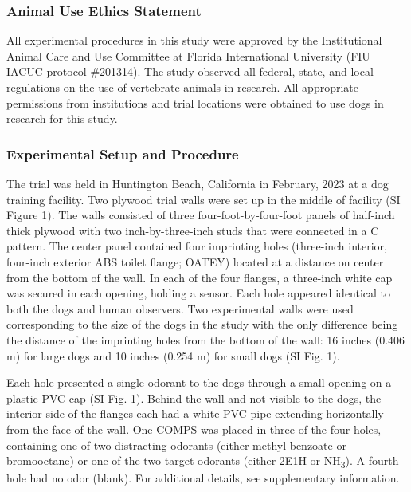 \documentclass[
]{article}
\begin{document}
\hypertarget{animal-use-ethics-statement}{%
\subsubsection{Animal Use Ethics Statement}\label{animal-use-ethics-statement}}

All experimental procedures in this study were approved by the Institutional Animal Care and Use Committee at Florida International University (FIU IACUC protocol \#201314). The study observed all federal, state, and local regulations on the use of vertebrate animals in research. All appropriate permissions from institutions and trial locations were obtained to use dogs in research for this study.

\hypertarget{experimental-setup-and-procedure}{%
\subsubsection{Experimental Setup and Procedure}\label{experimental-setup-and-procedure}}

The trial was held in Huntington Beach, California in February, 2023 at a dog training facility. Two plywood trial walls were set up in the middle of facility (SI Figure 1). The walls consisted of three four-foot-by-four-foot panels of half-inch thick plywood with two inch-by-three-inch studs that were connected in a C pattern. The center panel contained four imprinting holes (three-inch interior, four-inch exterior ABS toilet flange; OATEY) located at a distance on center from the bottom of the wall. In each of the four flanges, a three-inch white cap was secured in each opening, holding a sensor. Each hole appeared identical to both the dogs and human observers. Two experimental walls were used corresponding to the size of the dogs in the study with the only difference being the distance of the imprinting holes from the bottom of the wall: 16 inches (0.406 m) for large dogs and 10 inches (0.254 m) for small dogs (SI Fig. 1).

Each hole presented a single odorant to the dogs through a small opening on a plastic PVC cap (SI Fig. 1). Behind the wall and not visible to the dogs, the interior side of the flanges each had a white PVC pipe extending horizontally from the face of the wall. One COMPS was placed in three of the four holes, containing one of two distracting odorants (either methyl benzoate or bromooctane) or one of the two target odorants (either 2E1H or NH\textsubscript{3}). A fourth hole had no odor (blank). For additional details, see supplementary information.
\end{document}
